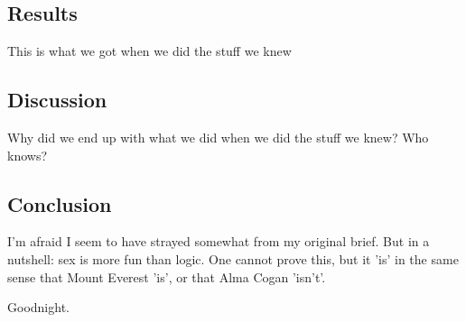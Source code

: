 \documentclass{article}
\begin{document}
\subsection*{Results}
This is what we got when we did the stuff we knew
\subsection*{Discussion}
Why did we end up with what we did when we did the stuff we knew? Who knows?
\subsection*{Conclusion}
 I'm afraid I seem to have strayed somewhat from my original brief. But in a nutshell: sex is more fun than logic. One cannot prove this, but it 'is' in the same sense that Mount Everest 'is', or that Alma Cogan 'isn't'.

Goodnight. 
\end{document}
